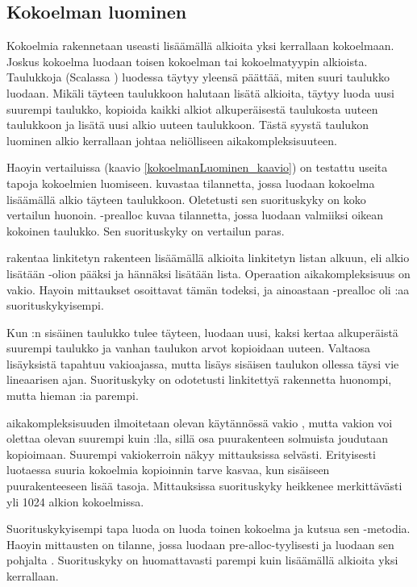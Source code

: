 \subsection{Kokoelman luominen}
Kokoelmia rakennetaan useasti lisäämällä alkioita yksi kerrallaan kokoelmaan. Joskus kokoelma luodaan toisen kokoelman tai kokoelmatyypin alkioista. Taulukkoja (Scalassa ) luodessa täytyy yleensä päättää, miten suuri taulukko luodaan. Mikäli täyteen taulukkoon halutaan lisätä alkioita, täytyy luoda uusi suurempi taulukko, kopioida kaikki alkiot alkuperäisestä taulukosta uuteen taulukkoon ja lisätä uusi alkio uuteen taulukkoon. Tästä syystä taulukon luominen alkio kerrallaan johtaa neliölliseen aikakompleksisuuteen.

Haoyin vertailuissa\cite{haoyiBenchmark} (kaavio \ref{kokoelmanLuominen_kaavio}) on testattu useita tapoja kokoelmien luomiseen.  kuvastaa tilannetta, jossa luodaan kokoelma lisäämällä alkio täyteen taulukkoon. Oletetusti sen suorituskyky on koko vertailun huonoin. -prealloc kuvaa tilannetta, jossa luodaan valmiiksi oikean kokoinen taulukko. Sen suorituskyky on vertailun paras.

 rakentaa linkitetyn rakenteen lisäämällä alkioita linkitetyn listan alkuun, eli alkio lisätään \code{::}-olion pääksi ja hännäksi lisätään lista. Operaation aikakompleksisuus on vakio. \cite{scalaCollections} Hayoin mittaukset osoittavat tämän todeksi, ja ainoastaan -prealloc oli :aa suorituskykyisempi.

Kun :n sisäinen taulukko tulee täyteen, luodaan uusi, kaksi kertaa alkuperäistä suurempi taulukko ja vanhan taulukon arvot kopioidaan uuteen. Valtaosa lisäyksistä tapahtuu vakioajassa, mutta lisäys sisäisen taulukon ollessa täysi vie lineaarisen ajan. Suorituskyky on odotetusti linkitettyä rakennetta huonompi, mutta hieman :ia parempi.

 aikakompleksisuuden ilmoitetaan olevan käytännössä vakio \cite{scalaCollections}, mutta vakion voi olettaa olevan suurempi kuin :lla, sillä osa puurakenteen solmuista joudutaan kopioimaan.  Suurempi vakiokerroin näkyy mittauksissa selvästi. Erityisesti luotaessa suuria kokoelmia kopioinnin tarve kasvaa, kun sisäiseen puurakenteeseen lisää tasoja. Mittauksissa suorituskyky heikkenee merkittävästi yli 1024 alkion kokoelmissa.

Suorituskykyisempi tapa luoda  on luoda toinen kokoelma ja kutsua sen -metodia. Haoyin\cite{haoyiBenchmark} mittausten  on tilanne, jossa luodaan  pre-alloc-tyylisesti ja luodaan sen pohjalta . Suorituskyky on huomattavasti parempi kuin lisäämällä alkioita yksi kerrallaan.

